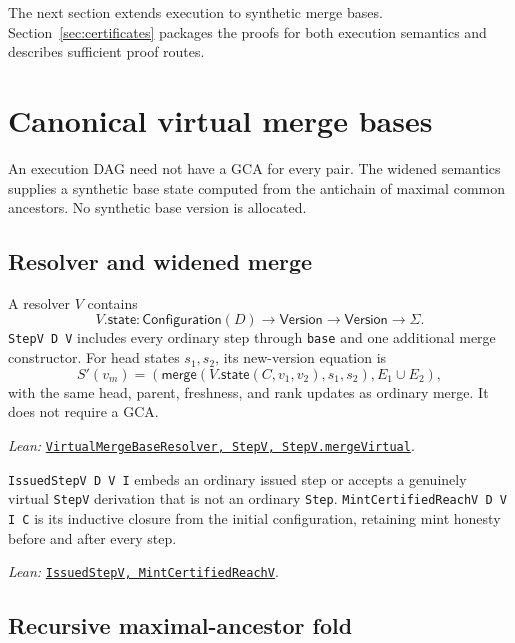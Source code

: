 \documentclass[11pt]{article}
\theoremstyle{definition}
\newcommand{\State}{\Sigma}
\newcommand{\Version}{\mathsf{Version}}
\newcommand{\merge}{\mathsf{merge}}
\newcommand{\lean}[1]{\texttt{#1}}
\newcommand{\src}[2]{\href{../../#1}{\texttt{#2}}}
\newcommand{\anchor}[2]{\par\smallskip\noindent\emph{Lean: }\src{#1}{#2}.}
\begin{document}
The next section extends execution to synthetic merge bases.
Section~\ref{sec:certificates} packages the proofs for both execution
semantics and describes sufficient proof routes.

\section{Canonical virtual merge bases}
\label{sec:virtual}

An execution DAG need not have a GCA for every pair. The widened
semantics supplies a synthetic base state computed from the antichain of
maximal common ancestors. No synthetic base version is allocated.

\subsection{Resolver and widened merge}

A resolver $V$ contains
\[
 V.\mathsf{state}:\mathsf{Configuration}(D)\to\Version\to\Version\to\State.
\]
\lean{StepV D V} includes every ordinary step through \lean{base} and one
additional merge constructor. For head states $s_1,s_2$, its new-version
equation is
\[
 S'(v_m)=
 (\merge(V.\mathsf{state}(C,v_1,v_2),s_1,s_2),E_1\cup E_2),
\]
with the same head, parent, freshness, and rank updates as ordinary merge. It
does not require a GCA.
\anchor{Sal/MRDTs/Framework/Execution.lean}
  {VirtualMergeBaseResolver, StepV, StepV.mergeVirtual}

\lean{IssuedStepV D V I} embeds an ordinary issued step or accepts a genuinely
virtual \lean{StepV} derivation that is not an ordinary \lean{Step}.
\lean{MintCertifiedReachV D V I C} is its inductive closure from the initial
configuration, retaining mint honesty before and after every step.
\anchor{Sal/MRDTs/Framework/Certificates.lean}
  {IssuedStepV, MintCertifiedReachV}

\subsection{Recursive maximal-ancestor fold}
\end{document}
